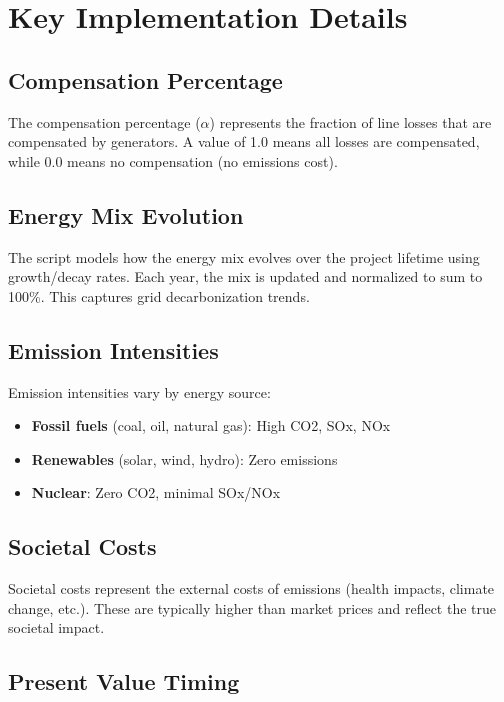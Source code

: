 \documentclass[ctcc_full_documentation.tex]{subfiles}
\begin{document}
\section{Key Implementation Details}

\subsection{Compensation Percentage}

The compensation percentage ($\alpha$) represents the fraction of line losses that are compensated by generators. A value of 1.0 means all losses are compensated, while 0.0 means no compensation (no emissions cost).

\subsection{Energy Mix Evolution}

The script models how the energy mix evolves over the project lifetime using growth/decay rates. Each year, the mix is updated and normalized to sum to 100\%. This captures grid decarbonization trends.

\subsection{Emission Intensities}

Emission intensities vary by energy source:
\begin{itemize}
    \item \textbf{Fossil fuels} (coal, oil, natural gas): High CO2, SOx, NOx
    \item \textbf{Renewables} (solar, wind, hydro): Zero emissions
    \item \textbf{Nuclear}: Zero CO2, minimal SOx/NOx
\end{itemize}

\subsection{Societal Costs}

Societal costs represent the external costs of emissions (health impacts, climate change, etc.). These are typically higher than market prices and reflect the true societal impact.

\subsection{Present Value Timing}
\end{document}
